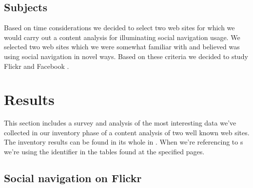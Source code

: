\subsection{Subjects}

Based on time considerations we decided to select two web sites for which
we would carry out a content analysis for illuminating social navigation
usage. We selected two web sites which we were somewhat familiar with and
believed was using social navigation in novel ways. Based on these criteria
we decided to study Flickr%
and Facebook%
.

\section{Results}

\removeline

This section includes a survey and analysis of the most interesting
data we've collected in our inventory phase of a content analysis
of two well known web sites. The inventory results can be found in its whole
in . When we're referencing to s we're
using the identifier in the tables found at the specified pages.

\subsection{Social navigation on Flickr}
\label{section:analysis.flickr}


